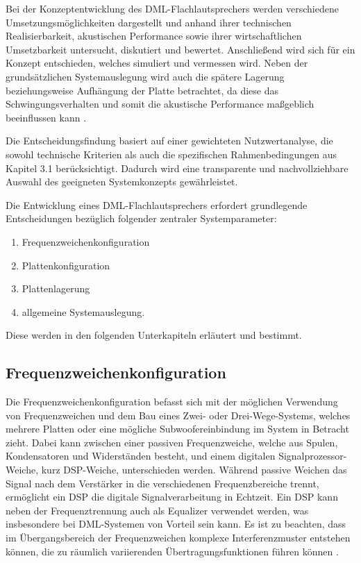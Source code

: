 Bei der Konzeptentwicklung des DML-Flachlautsprechers werden verschiedene Umsetzungsmöglichkeiten dargestellt und anhand ihrer technischen Realisierbarkeit, akustischen Performance sowie ihrer wirtschaftlichen Umsetzbarkeit untersucht, diskutiert und bewertet. Anschließend wird sich für ein Konzept entschieden, welches simuliert und vermessen wird. Neben der grundsätzlichen Systemauslegung wird auch die spätere Lagerung beziehungsweise Aufhängung der Platte betrachtet, da diese das Schwingungsverhalten und somit die akustische Performance maßgeblich beeinflussen kann \cite{Bai2001}.

Die Entscheidungsfindung basiert auf einer gewichteten Nutzwertanalyse, die sowohl technische Kriterien als auch die spezifischen Rahmenbedingungen aus Kapitel 3.1 berücksichtigt. Dadurch wird eine transparente und nachvollziehbare Auswahl des geeigneten Systemkonzepts gewährleistet.

Die Entwicklung eines DML-Flachlautsprechers erfordert grundlegende Entscheidungen bezüglich folgender zentraler Systemparameter:

\begin{enumerate}
    \item Frequenzweichenkonfiguration
    \item Plattenkonfiguration
    \item Plattenlagerung
    \item allgemeine Systemauslegung. 
\end{enumerate}

Diese werden in den folgenden Unterkapiteln erläutert und bestimmt.

\subsection{Frequenzweichenkonfiguration}

Die Frequenzweichenkonfiguration befasst sich mit der möglichen Verwendung von Frequenzweichen und dem Bau eines Zwei- oder Drei-Wege-Systems, welches mehrere Platten oder eine mögliche Subwoofereinbindung im System in Betracht zieht. Dabei kann zwischen einer passiven Frequenzweiche, welche aus Spulen, Kondensatoren und Widerständen besteht, und einem digitalen Signalprozessor-Weiche, kurz DSP-Weiche, unterschieden werden.
Während passive Weichen das Signal nach dem Verstärker in die verschiedenen Frequenzbereiche trennt, ermöglicht ein DSP die digitale Signalverarbeitung in Echtzeit. Ein DSP kann neben der Frequenztrennung auch als Equalizer verwendet werden, was insbesondere bei DML-Systemen von Vorteil sein kann. 
Es ist zu beachten, dass im Übergangsbereich der Frequenzweichen komplexe Interferenzmuster entstehen können, die zu räumlich variierenden Übertragungsfunktionen führen können \cite{Moeser2005}.


